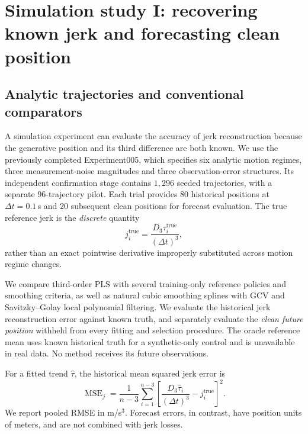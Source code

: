 \section{Simulation study I: recovering known jerk and forecasting clean position}
\label{sec:simulation}

\subsection{Analytic trajectories and conventional comparators}
A simulation experiment can evaluate the accuracy of
jerk reconstruction because the generative position
and its third difference are both known. We use
the previously completed Experiment005, which
specifies six analytic motion regimes, three
measurement-noise magnitudes and three
observation-error structures. Its independent
confirmation stage contains $1{,}296$
seeded trajectories, with a separate
$96$-trajectory pilot. Each trial provides
80 historical positions at $\Delta t=0.1$\,s
and 20 subsequent clean positions for
forecast evaluation. The true reference
jerk is the \emph{discrete} quantity
\[
j_i^{\mathrm{true}}
=\frac{D_3\tau_i^{\mathrm{true}}}{(\Delta t)^3},
\]
rather than an exact pointwise derivative
improperly substituted across motion
regime changes.

We compare third-order PLS with several
training-only reference policies and
smoothing criteria, as well as natural
cubic smoothing splines with GCV
and Savitzky--Golay local polynomial
filtering. We evaluate the historical
jerk reconstruction error against known
truth, and separately evaluate the
\emph{clean future position} withheld
from every fitting and selection procedure.
The oracle reference mean uses known
historical truth for a synthetic-only
control and is unavailable in real data.
No method receives its future observations.

For a fitted trend $\widehat\tau$,
the historical mean squared jerk error is
\begin{equation}
\label{eq:jerk-risk}
\operatorname{MSE}_{j}
=\frac{1}{n-3}
\sum_{i=1}^{n-3}
\left[
\frac{D_3\widehat\tau_i}{(\Delta t)^3}
-j_i^{\mathrm{true}}
\right]^2.
\end{equation}
We report pooled RMSE in m/s$^3$.
Forecast errors, in contrast, have
position units of meters, and are
not combined with jerk losses.

